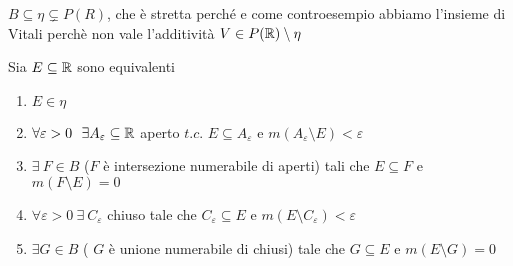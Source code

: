 \documentclass[12px]{article}
\begin{document}
$B\subseteq \eta\subsetneq P(R)$, che è stretta perché e come controesempio abbiamo l'insieme di Vitali perchè non vale l'additività  $V\in P(\mathbb{R})\setminus\eta$\\
\begin{teo}
	Sia $E\subseteq \mathbb{R}$ sono equivalenti
	 \begin{enumerate}
		 \item $E\in\eta$
		 \item  $\forall \varepsilon > 0 \ \ \exists A_\varepsilon\subseteq\mathbb{R}$ aperto $t.c.$ $E\subseteq A_\varepsilon$ e $m(A_\varepsilon\setminus E)< \varepsilon$
		 \item  $\exists \ F\in B$ ($F$ è intersezione numerabile di aperti) tali che $E\subseteq F$ e $m(F\setminus E) = 0$
		 \item  $\forall \varepsilon > 0 \ \exists \ C_\varepsilon$ chiuso tale che $C_\varepsilon\subseteq E$ e $m(E\setminus C_\varepsilon) < \varepsilon$
		 \item  $\exists G\in B$ ( $G$ è unione numerabile di chiusi) tale che $G\subseteq E$ e $m(E\setminus G) = 0$
	\end{enumerate}
\end{teo}
\end{document}
